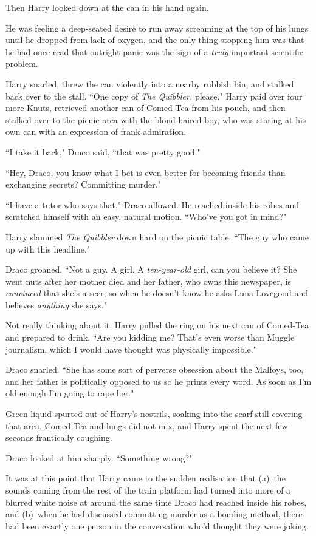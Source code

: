 Then Harry looked down at the can in his hand again.

He was feeling a deep-seated desire to run away screaming at the top of his lungs until he dropped from lack of oxygen, and the only thing stopping him was that he had once read that outright panic was the sign of a \emph{truly} important scientific problem.

Harry snarled, threw the can violently into a nearby rubbish bin, and stalked back over to the stall. ``One copy of \emph{The Quibbler,} please." Harry paid over four more Knuts, retrieved another can of Comed-Tea from his pouch, and then stalked over to the picnic area with the blond-haired boy, who was staring at his own can with an expression of frank admiration.

``I take it back," Draco said, ``that was pretty good."

``Hey, Draco, you know what I bet is even better for becoming friends than exchanging secrets? Committing murder."

``I have a tutor who says that," Draco allowed. He reached inside his robes and scratched himself with an easy, natural motion. ``Who've you got in mind?"

Harry slammed \emph{The Quibbler} down hard on the picnic table. ``The guy who came up with this headline."

Draco groaned. ``Not a guy. A girl. A \emph{ten-year-old} girl, can you believe it? She went nuts after her mother died and her father, who owns this newspaper, is \emph{convinced} that she's a seer, so when he doesn't know he asks Luna Lovegood and believes \emph{anything} she says."

Not really thinking about it, Harry pulled the ring on his next can of Comed-Tea and prepared to drink. ``Are you kidding me? That's even worse than Muggle journalism, which I would have thought was physically impossible."

Draco snarled. ``She has some sort of perverse obsession about the Malfoys, too, and her father is politically opposed to us so he prints every word. As soon as I'm old enough I'm going to rape her."

Green liquid spurted out of Harry's nostrils, soaking into the scarf still covering that area. Comed-Tea and lungs did not mix, and Harry spent the next few seconds frantically coughing.

Draco looked at him sharply. ``Something wrong?"

It was at this point that Harry came to the sudden realisation that (a)~the sounds coming from the rest of the train platform had turned into more of a blurred white noise at around the same time Draco had reached inside his robes, and (b)~when he had discussed committing murder as a bonding method, there had been exactly one person in the conversation who'd thought they were joking.

